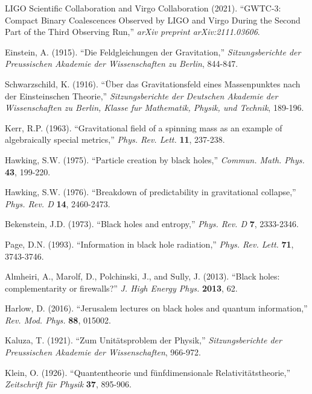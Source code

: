 \documentclass[12pt,a4paper]{article}
\begin{document}
\begin{thebibliography}{200}
LIGO Scientific Collaboration and Virgo Collaboration (2021). ``GWTC-3: Compact Binary Coalescences Observed by LIGO and Virgo During the Second Part of the Third Observing Run,'' \textit{arXiv preprint arXiv:2111.03606}.

Einstein, A. (1915). ``Die Feldgleichungen der Gravitation,'' \textit{Sitzungsberichte der Preussischen Akademie der Wissenschaften zu Berlin}, 844-847.

Schwarzschild, K. (1916). ``Über das Gravitationsfeld eines Massenpunktes nach der Einsteinschen Theorie,'' \textit{Sitzungsberichte der Deutschen Akademie der Wissenschaften zu Berlin, Klasse fur Mathematik, Physik, und Technik}, 189-196.

Kerr, R.P. (1963). ``Gravitational field of a spinning mass as an example of algebraically special metrics,'' \textit{Phys. Rev. Lett.} \textbf{11}, 237-238.

Hawking, S.W. (1975). ``Particle creation by black holes,'' \textit{Commun. Math. Phys.} \textbf{43}, 199-220.

Hawking, S.W. (1976). ``Breakdown of predictability in gravitational collapse,'' \textit{Phys. Rev. D} \textbf{14}, 2460-2473.

Bekenstein, J.D. (1973). ``Black holes and entropy,'' \textit{Phys. Rev. D} \textbf{7}, 2333-2346.

Page, D.N. (1993). ``Information in black hole radiation,'' \textit{Phys. Rev. Lett.} \textbf{71}, 3743-3746.

Almheiri, A., Marolf, D., Polchinski, J., and Sully, J. (2013). ``Black holes: complementarity or firewalls?'' \textit{J. High Energy Phys.} \textbf{2013}, 62.

Harlow, D. (2016). ``Jerusalem lectures on black holes and quantum information,'' \textit{Rev. Mod. Phys.} \textbf{88}, 015002.

Kaluza, T. (1921). ``Zum Unitätsproblem der Physik,'' \textit{Sitzungsberichte der Preussischen Akademie der Wissenschaften}, 966-972.

Klein, O. (1926). ``Quantentheorie und fünfdimensionale Relativitätstheorie,'' \textit{Zeitschrift für Physik} \textbf{37}, 895-906.


\end{thebibliography}
\end{document}
